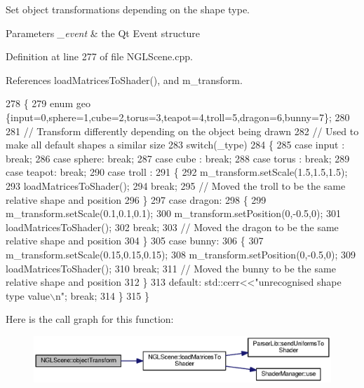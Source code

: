 Set object transformations depending on the shape type. 


\begin{DoxyParams}{Parameters}
{\em \-\_\-event} & the Qt Event structure \\
\hline
\end{DoxyParams}


Definition at line 277 of file N\-G\-L\-Scene.\-cpp.



References load\-Matrices\-To\-Shader(), and m\-\_\-transform.


\begin{DoxyCode}
278 \{
279   \textcolor{keyword}{enum} geo \{input=0,sphere=1,cube=2,torus=3,teapot=4,troll=5,dragon=6,bunny=7\};
280 
281   \textcolor{comment}{// Transform differently depending on the object being drawn}
282   \textcolor{comment}{// Used to make all default shapes a similar size}
283   \textcolor{keywordflow}{switch}(\_type)
284   \{
285   \textcolor{keywordflow}{case} input : \textcolor{keywordflow}{break};
286   \textcolor{keywordflow}{case} sphere: \textcolor{keywordflow}{break};
287   \textcolor{keywordflow}{case} cube  : \textcolor{keywordflow}{break};
288   \textcolor{keywordflow}{case} torus : \textcolor{keywordflow}{break};
289   \textcolor{keywordflow}{case} teapot: \textcolor{keywordflow}{break};
290   \textcolor{keywordflow}{case} troll :
291   \{
292     m_transform.setScale(1.5,1.5,1.5);
293     loadMatricesToShader();
294     \textcolor{keywordflow}{break};
295     \textcolor{comment}{// Moved the troll to be the same relative shape and position}
296   \}
297   \textcolor{keywordflow}{case} dragon:
298   \{
299     m_transform.setScale(0.1,0.1,0.1);
300     m_transform.setPosition(0,-0.5,0);
301     loadMatricesToShader();
302     \textcolor{keywordflow}{break};
303     \textcolor{comment}{// Moved the dragon to be the same relative shape and position}
304   \}
305   \textcolor{keywordflow}{case} bunny:
306   \{
307     m_transform.setScale(0.15,0.15,0.15);
308     m_transform.setPosition(0,-0.5,0);
309     loadMatricesToShader();
310     \textcolor{keywordflow}{break};
311     \textcolor{comment}{// Moved the bunny to be the same relative shape and position}
312   \}
313   \textcolor{keywordflow}{default}: std::cerr<<\textcolor{stringliteral}{"unrecognised shape type value\(\backslash\)n"}; \textcolor{keywordflow}{break};
314   \}
315 \}
\end{DoxyCode}


Here is the call graph for this function\-:\nopagebreak
\begin{figure}[H]
\begin{center}
\leavevmode
\includegraphics[width=350pt]{class_n_g_l_scene_ae3e8dc1c180d89afa997104c3dd707a0_cgraph}
\end{center}
\end{figure}




